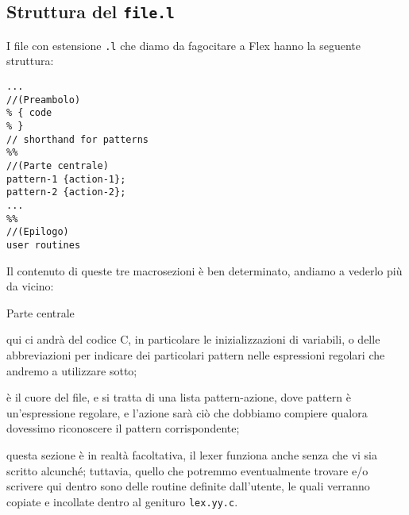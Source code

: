 \documentclass[class=book, crop=false, oneside, 12pt]{standalone}
\begin{document}
\subsection{Struttura del \texttt{file.l}}
I file con estensione \texttt{.l} che diamo da fagocitare a Flex hanno la seguente struttura:
\begin{verbatim}
...
//(Preambolo)
% { code
% }
// shorthand for patterns
%%
//(Parte centrale)
pattern-1 {action-1};
pattern-2 {action-2};
...
%%
//(Epilogo)
user routines
\end{verbatim}
Il contenuto di queste tre macrosezioni è ben determinato, andiamo a vederlo più da vicino:
\begin{labeling}{Parte centrale}
    \item[Preambolo] qui ci andrà del codice C, in particolare le inizializzazioni di variabili, o delle abbreviazioni per indicare dei particolari pattern nelle espressioni regolari che andremo a utilizzare sotto;
    \item[Parte centrale] è il cuore del file, e si tratta di una lista pattern-azione, dove pattern è un'espressione regolare, e l'azione sarà ciò che dobbiamo compiere qualora dovessimo riconoscere il pattern corrispondente;
    \item[Epilogo] questa sezione è in realtà facoltativa, il lexer funziona anche senza che vi sia scritto alcunché; tuttavia, quello che potremmo eventualmente trovare e/o scrivere qui dentro sono delle routine definite dall'utente, le quali verranno copiate e incollate dentro al genituro \texttt{lex.yy.c}.
\end{labeling}
\end{document}
